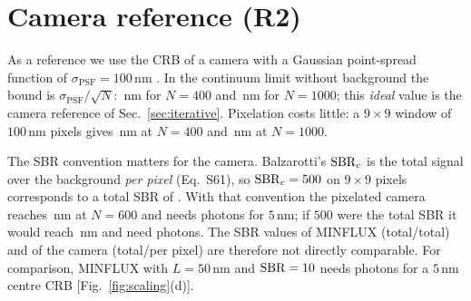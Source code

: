 \section{Camera reference (R2)}\label{sec:camera}

As a reference we use the CRB of a camera with a Gaussian point-spread function of
$\sigma_{\mathrm{PSF}}=100$\,nm \cite{Balzarotti2017}. In the continuum limit without background
the bound is $\sigma_{\mathrm{PSF}}/\sqrt N$:
\,nm for $N=400$ and
\,nm for $N=1000$; this \emph{ideal} value is the
camera reference of Sec.~\ref{sec:iterative}. Pixelation costs little: a $9\times9$ window of
$100$\,nm pixels gives \,nm
at $N=400$ and \,nm at
$N=1000$.

The SBR convention matters for the camera. Balzarotti's $\mathrm{SBR}_c$ is the total signal over the
background \emph{per pixel} (Eq.~S61), so $\mathrm{SBR}_c=500$ on $9\times9$ pixels corresponds to a total
SBR of . With that
convention the pixelated camera reaches
\,nm at $N=600$ and
needs 
photons for $5$\,nm; if $500$ were the total SBR it would reach
\,nm and need
 photons. The
SBR values of MINFLUX (total/total) and of the camera (total/per pixel) are therefore not
directly comparable. For comparison, MINFLUX with $L=50$\,nm and $\mathrm{SBR}=10$ needs
 photons for a $5$\,nm centre CRB
[Fig.~\ref{fig:scaling}(d)].
